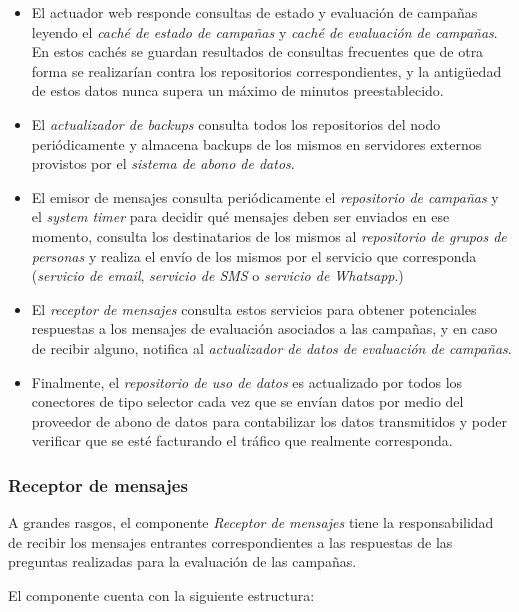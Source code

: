 \documentclass[a4paper, 10pt, twoside]{article}
\begin{document}
\begin{itemize}
  \item El actuador web responde consultas de estado y evaluación de campañas leyendo el \textit{caché de estado de campañas} y \textit{caché de evaluación de campañas}. En estos cachés se guardan resultados de consultas frecuentes que de otra forma se realizarían contra los repositorios correspondientes, y la antigüedad de estos datos nunca supera un máximo de minutos preestablecido.

  \item El \textit{actualizador de backups} consulta todos los repositorios del nodo periódicamente y almacena backups de los mismos en servidores externos provistos por el \textit{sistema de abono de datos}.

  \item El emisor de mensajes consulta periódicamente el \textit{repositorio de campañas} y el \textit{system timer} para decidir qué mensajes deben ser enviados en ese momento, consulta los destinatarios de los mismos al \textit{repositorio de grupos de personas} y realiza el envío de los mismos por el servicio que corresponda (\textit{servicio de email}, \textit{servicio de SMS} o \textit{servicio de Whatsapp}.)

  \item El \textit{receptor de mensajes} consulta estos servicios para obtener potenciales respuestas a los mensajes de evaluación asociados a las campañas, y en caso de recibir alguno, notifica al \textit{actualizador de datos de evaluación de campañas}.

  \item Finalmente, el \textit{repositorio de uso de datos} es actualizado por todos los conectores de tipo selector cada vez que se envían datos por medio del proveedor de abono de datos para contabilizar los datos transmitidos y poder verificar que se esté facturando el tráfico que realmente corresponda.
\end{itemize}


\subsubsection{Receptor de mensajes}

A grandes rasgos, el componente \textit{Receptor de mensajes} tiene la responsabilidad de recibir los mensajes entrantes correspondientes a las respuestas de las preguntas realizadas para la evaluación de las campañas.

El componente cuenta con la siguiente estructura:
\end{document}
